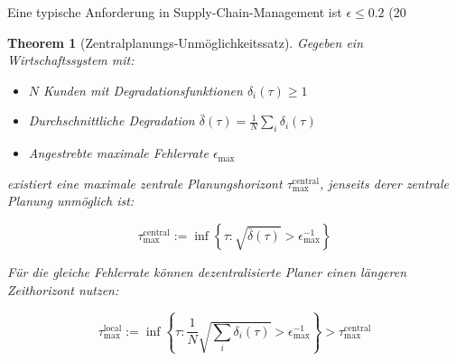 \documentclass[12pt, a4paper, titlepage]{report}
\newtheorem{theorem}{Theorem}[section]
\theoremstyle{definition}
\theoremstyle{remark}
\begin{document}
Eine typische Anforderung in Supply-Chain-Management ist $\epsilon \leq 0.2$ (20%

\begin{theorem}[Zentralplanungs-Unmöglichkeitssatz]
\label{thm:central_planning_impossible}
Gegeben ein Wirtschaftssystem mit:
\begin{itemize}
  \item $N$ Kunden mit Degradationsfunktionen $\delta_i(\tau) \geq 1$
  \item Durchschnittliche Degradation $\bar{\delta}(\tau) = \frac{1}{N}\sum_i \delta_i(\tau)$
  \item Angestrebte maximale Fehlerrate $\epsilon_{\max}$
\end{itemize}

existiert eine maximale zentrale Planungshorizont $\tau_{\max}^{\text{central}}$, jenseits derer zentrale Planung unmöglich ist:

\begin{equation}
\tau_{\max}^{\text{central}} := \inf\left\{\tau : \sqrt{\bar{\delta}(\tau)} > \epsilon_{\max}^{-1} \right\}
\label{eq:central_horizon}
\end{equation}

Für die gleiche Fehlerrate können dezentralisierte Planer einen längeren Zeithorizont nutzen:

\begin{equation}
\tau_{\max}^{\text{local}} := \inf\left\{\tau : \frac{1}{N}\sqrt{\sum_i \delta_i(\tau)} > \epsilon_{\max}^{-1} \right\} > \tau_{\max}^{\text{central}}
\label{eq:local_horizon}
\end{equation}
\end{theorem}
\end{document}
